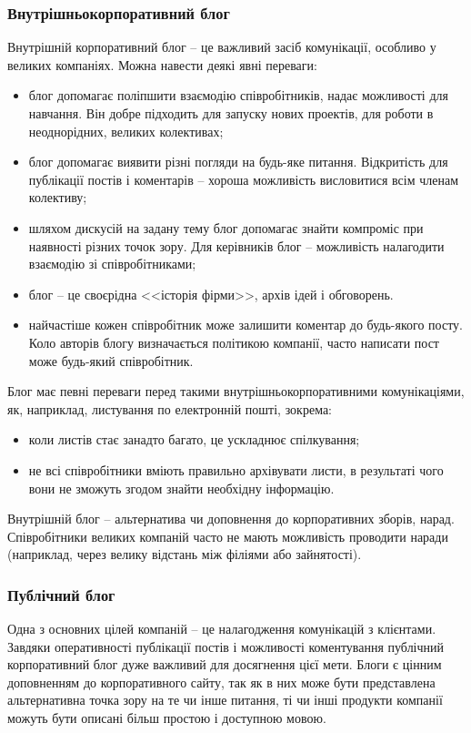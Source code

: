\subsubsection{Внутрішньокорпоративний блог}
Внутрішній корпоративний блог -- це важливий засіб комунікації, особливо у великих компаніях. 
Можна навести деякі явні переваги:
\begin{itemize}
\item блог допомагає поліпшити взаємодію співробітників, надає можливості для навчання. Він добре підходить для запуску нових проектів, для роботи в неоднорідних, великих колективах;
\item блог допомагає виявити різні погляди на будь-яке питання. Відкритість для публікації постів і коментарів -- хороша можливість висловитися всім членам колективу;
\item шляхом дискусій на задану тему блог допомагає знайти компроміс при наявності різних точок зору.
Для керівників блог -- можливість налагодити взаємодію зі співробітниками;
\item блог -- це своєрідна <<історія фірми>>, архів ідей і обговорень.
\item найчастіше кожен співробітник може залишити коментар до будь-якого посту. Коло авторів блогу визначається політикою компанії, часто написати пост може будь-який співробітник.
\end{itemize}


Блог має певні переваги перед такими внутрішньокорпоративними комунікаціями, як, наприклад, листування по електронній пошті, зокрема:

\begin{itemize}
\item коли листів стає занадто багато, це ускладнює спілкування;
\item не всі співробітники вміють правильно архівувати листи, в результаті чого вони не зможуть згодом знайти необхідну інформацію.
\end{itemize}

Внутрішній блог -- альтернатива чи доповнення до корпоративних зборів, нарад. 
Співробітники великих компаній часто не мають можливість проводити наради (наприклад, через велику відстань між філіями або зайнятості).

\subsubsection{Публічний блог}
Одна з основних цілей компаній -- це налагодження комунікацій з клієнтами.
Завдяки оперативності публікації постів і можливості коментування публічний корпоративний блог дуже важливий для досягнення цієї мети.
Блоги є цінним доповненням до корпоративного сайту, так як в них може бути представлена альтернативна точка зору на те чи інше питання, ті чи інші продукти компанії можуть бути описані більш простою і доступною мовою.
